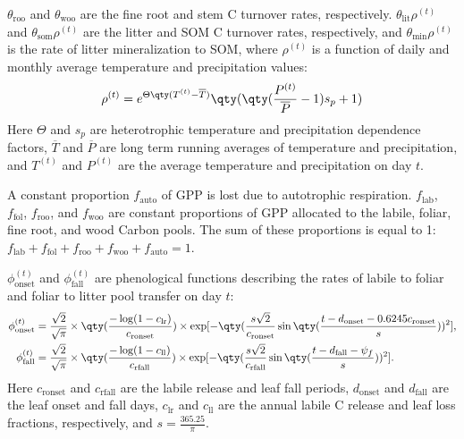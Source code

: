 \documentclass{article}
\begin{document}
			$\theta_\text{roo}$ and $\theta_\text{woo}$ are the fine root and stem C turnover rates, respectively.  $\theta_\text{lit} \rho^{(t)}$ and $\theta_\text{som} \rho^{(t)}$ are the litter and SOM C turnover rates, respectively, and $\theta_\text{min} \rho^{(t)}$ is the rate of litter mineralization to SOM, where $\rho^{(t)}$ is a function of daily and monthly average temperature and precipitation values:
			\begin{align}
				\rho^{(t)} = e^{\Theta\qty(T^{(t)} - \overline{T})}\qty(\qty(\frac{P^{(t)}}{\overline{P}}-1)s_p+1)
			\end{align}
			Here $\Theta$ and $s_p$ are heterotrophic temperature and precipitation dependence factors, $\overline{T}$ and $\overline{P}$ are long term running averages of temperature and precipitation, and $T^{(t)}$ and $P^{(t)}$ are the average temperature and precipitation on day $t$.

			A constant proportion $f_\text{auto}$ of GPP is lost due to autotrophic respiration.  $f_\text{lab}$, $f_\text{fol}$, $f_\text{roo}$, and $f_\text{woo}$ are constant proportions of GPP allocated to the labile, foliar, fine root, and wood Carbon pools.  The sum of these proportions is equal to 1: $f_\text{lab} + f_\text{fol} + f_\text{roo} + f_\text{woo} + f_\text{auto} = 1$.

			$\phi_\text{onset}^{(t)}$ and $\phi_\text{fall}^{(t)}$ are phenological functions describing the rates of labile to foliar and foliar to litter pool transfer on day $t$:
			\begin{align}
				\phi_\text{onset}^{(t)} &= \frac{\sqrt{2}}{\sqrt{\pi}}\times\qty(\frac{-\log(1-c_\text{lr})}{c_\text{ronset}})\times\exp[-\qty(\frac{s\sqrt{2}}{c_\text{ronset}}\sin\qty(\frac{t-d_\text{onset}-0.6245c_\text{ronset}}{s}))^2],\\
				\phi_\text{fall}^{(t)} &= \frac{\sqrt{2}}{\sqrt{\pi}}\times\qty(\frac{-\log(1-c_\text{ll})}{c_\text{rfall}})\times\exp[-\qty(\frac{s\sqrt{2}}{c_\text{rfall}}\sin\qty(\frac{t - d_\text{fall} - \psi_f}{s}))^2].
			\end{align}
			Here $c_\text{ronset}$ and $c_\text{rfall}$ are the labile release and leaf fall periods, $d_\text{onset}$ and $d_\text{fall}$ are the leaf onset and fall days, $c_\text{lr}$ and $c_\text{ll}$ are the annual labile C release and leaf loss fractions, respectively, and $s = \frac{365.25}{\pi}$.
\end{document}
